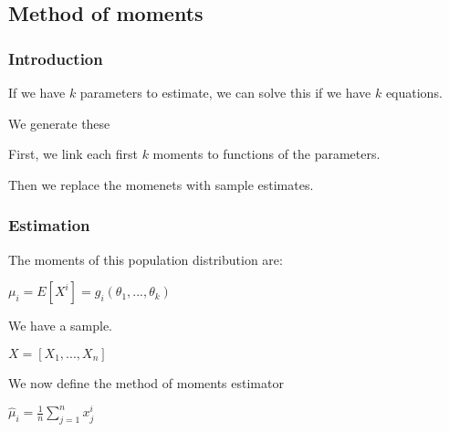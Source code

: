 
\subsection{Method of moments}

\subsubsection{Introduction}

If we have \(k\) parameters to estimate, we can solve this if we have \(k\) equations.

We generate these

First, we link each first \(k\) moments to functions of the parameters.

Then we replace the momenets with sample estimates.

\subsubsection{Estimation}

The moments of this population distribution are:

$\mu_i =E[X^i]=g_i(\theta_1,...,\theta_k)$

We have a sample.

$X=[X_1,...,X_n]$

We now define the method of moments estimator

$\hat \mu_i=\frac{1}{n}\sum_{j=1}^nx_j^i$




